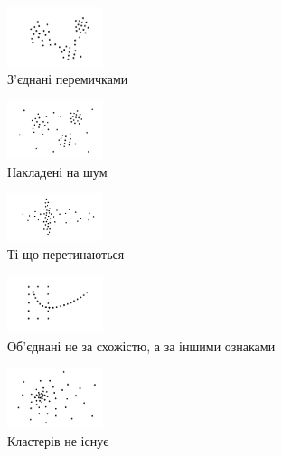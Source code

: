 \documentclass[a4paper,14pt,russian]{extreport}
\begin{document}
\begin{figure}[h]
    \centering
    \includegraphics[width=0.25\textwidth]{4}
    \caption{З'єднані перемичками}
\end{figure}
	
	
\begin{figure}[h]
    \centering
    \includegraphics[width=0.25\textwidth]{5}
    \caption{Накладені на шум}
\end{figure}

\begin{figure}[h]
    \centering
    \includegraphics[width=0.25\textwidth]{6}
    \caption{Ті що перетинаються}
\end{figure}

\begin{figure}[h]
    \centering
    \includegraphics[width=0.25\textwidth]{7}
    \caption{Об'єднані не за схожістю, а за іншими ознаками}
\end{figure}

\begin{figure}[h]
    \centering
    \includegraphics[width=0.25\textwidth]{8}
    \caption{Кластерів не існує}
\end{figure}

\newpage
\end{document}
